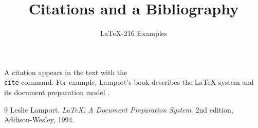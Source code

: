 \documentclass{article}
\title{Citations and a Bibliography}
\author{LaTeX-216 Examples}
\date{}
\begin{document}
\maketitle

A citation appears in the text with the \texttt{\\cite} command. For example,
Lamport's book describes the LaTeX system and its document preparation model
\cite{lamport1994}.

\begin{thebibliography}{9}
  Leslie Lamport.
  \emph{LaTeX: A Document Preparation System}.
  2nd edition, Addison-Wesley, 1994.
\end{thebibliography}
\end{document}
